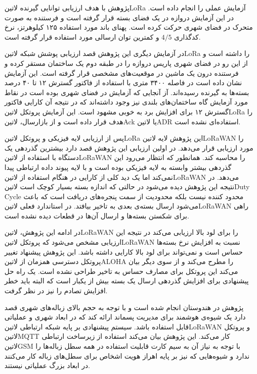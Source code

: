 
پژوهش  با هدف ارزیابی توانایی گیرنده ‌لاتین{LoRa} آزمایش عملی را انجام داده است. در این آزمایش دروازه در یک فضای بسته قرار گرفته است و فرستنده
به صورت متحرک در فضای شهری حرکت کرده است. پهنای باند مورد استفاده ۱۲۵ کیلوهرتز، نرخ کدگذاری $4/5$ و کمترین توان ارسالی مورد استفاده قرار گرفته است.

در آزمایش دیگری این پژوهش قصد ارزیابی پوشش شبکه ‌لاتین{LoRa} را داشته است و از این رو در فضای شهری پاریس دروازه را در طبقه دوم یک ساختمان مستقر کرده و فرستنده
درون یک ماشین در موقعیت‌های مشخصی قرار گرفته است. این آزمایش نشان داده است در فاصله ۳۴۰۰ متری با استفاده از فاکتور گسترش ۱۲ تا ۴۰ درصد بسته‌ها به گیرنده رسیده‌اند.
آز آنجایی که آزمایش در فضای شهری بوده است در نقاط مورد آزمایش گاه ساختمان‌های بلندی نیز وجود داشته‌اند که در نتیجه آن کارایی فاکتور گسترش ۱۲ برای افزایش برد به خوبی مشهود است.
این آزمایش پروتکل ‌لاتین{LoRa} را هدف قرار داده است و از بازارسال، ‌لاتین{Ack} یا ‌لاتین{ADR} استفاده‌ای نشده است.

پس از ارزیابی لایه فیزیکی و پروتکل ‌لاتین{LoRa} این پژوهش لایه ‌لاتین{LoRaWAN} را مورد ارزیابی قرار می‌دهد. در اولین ارزیابی این پژوهش قصد دارد بیشترین گذردهی یک دستگاه
با استفاده از ‌لاتین{LoRaWAN} را محاسبه کند. همانطور که انتظار می‌رود این گذردهی بیشتر وابسته به لایه فیزیکی بوده است و با لایه پیوند داده ارتباطی پیدا نمی‌کند اما یک دید کلی از
کارایی در هنگام استفاده از ‌لاتین{LoRaWAN} می‌دهد. در نتیجه این پژوهش دیده می‌شود در حالتی که اندازه بسته بسیار کوچک است ‌لاتین{Duty Cycle} محدود کننده نیست بلکه
محدودیت از سمت پنجره‌های دریافت است که باعث می‌شود ارسال بسته‌ی بعدی به تاخیر بیافتد. در استاندارد فعلی ‌لاتین{LoRaWAN} راهی برای شکستن بسته‌ها و ارسال آن‌ها در قطعات دیده نشده است.

در ادامه این پژوهش، ‌لاتین{LoRaWAN} را برای لود بالا ارزیابی می‌کند در نتیجه این ارزیابی مشخص می‌شود که پروتکل ‌لاتین{LoRaWAN} نسبت به افزایش نرخ بسته‌ها حساس است و نمی‌تواند برای لود بالا کارایی داشته باشد.
این پژوهش پیشنهاد تغییر پروتکل دسترسی همزمان از ‌لاتین{ALOHA} را مطرح می‌کند و از سوی دیگر بیان می‌کند این پروتکل برای مصارف حساس به تاخیر طراحی نشده است.
یک راه حل پیشنهادی برای افزایش گذردهی ارسال یک بسته
بیش از یکبار است که البته باید خطر افزایش تصادم را نیز در نظر گرفت.



پژوهش  در هندوستان انجام شده است و با توجه به حجم بالای زباله‌های شهری قصد دارد یک شیوه‌ی هوشمند برای مدیریت پسماند ارائه کند که در ابعاد شهری و عملیاتی قابل استفاده باشد.
سیستم پیشنهادی بر پایه شبکه ارتباطی ‌لاتین{LoRaWAN} و پروتکل ‌لاتین{MQTT} کار می‌کند. این پژوهش بیان می‌کند استفاده از زیرساخت ارتباطی ‌لاتین{GSM} با توجه به نیاز آن به سیم کارت قابلیت
استفاده در همه سطل زباله‌ها را ندارد و شیوه‌هایی که نیز بر پایه اهراز هویت اشخاص برای سطل‌های زباله کار می‌کنند در ابعاد بزرگ عملیاتی نیستند.

